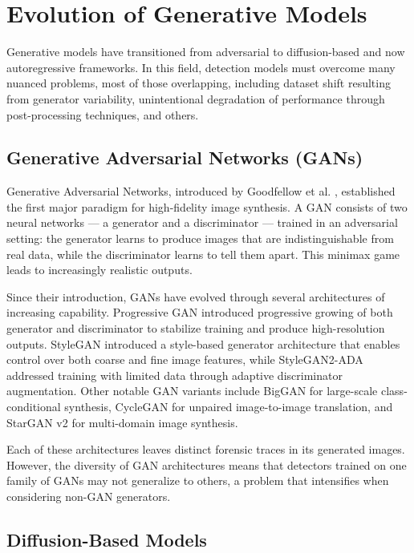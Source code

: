 \documentclass[12pt,a4paper]{book}
\theoremstyle{definition}
\theoremstyle{remark}
\begin{document}
\section{Evolution of Generative Models}\label{sec:gen-models}

Generative models have transitioned from adversarial to diffusion-based and now autoregressive frameworks. In this field, detection models must overcome many nuanced problems, most of those overlapping, including dataset shift resulting from generator variability, unintentional degradation of performance through post-processing techniques, and others.

\subsection{Generative Adversarial Networks (GANs)}\label{sec:gans}

Generative Adversarial Networks, introduced by Goodfellow et al. \cite{goodfellow2014generative}, established the first major paradigm for high-fidelity image synthesis. A GAN consists of two neural networks --- a generator and a discriminator --- trained in an adversarial setting: the generator learns to produce images that are indistinguishable from real data, while the discriminator learns to tell them apart. This minimax game leads to increasingly realistic outputs.

Since their introduction, GANs have evolved through several architectures of increasing capability. Progressive GAN \cite{karras2018celeba} introduced progressive growing of both generator and discriminator to stabilize training and produce high-resolution outputs. StyleGAN \cite{karras2019ffhq} introduced a style-based generator architecture that enables control over both coarse and fine image features, while StyleGAN2-ADA \cite{karras2020metfaces} addressed training with limited data through adaptive discriminator augmentation. Other notable GAN variants include BigGAN \cite{brock2019biggan} for large-scale class-conditional synthesis, CycleGAN \cite{zhu2017cyclegan} for unpaired image-to-image translation, and StarGAN v2 \cite{choi2020starganv2} for multi-domain image synthesis.

Each of these architectures leaves distinct forensic traces in its generated images. However, the diversity of GAN architectures means that detectors trained on one family of GANs may not generalize to others, a problem that intensifies when considering non-GAN generators.


\subsection{Diffusion-Based Models}\label{sec:diffusion}
\end{document}
